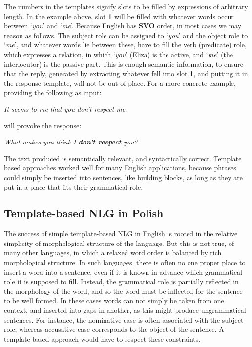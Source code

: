 \documentclass[12pt]{article}
\newcommand{\gloss}[1]{\vspace{10pt}\indent\textit{#1}\vspace{5pt}}
\newcommand{\inlinegloss}[1]{`\textit{#1}'}
\begin{document}
The numbers in the templates signify slots to be filled by expressions of arbitrary length. In the example above, slot \textbf{1} will be filled with whatever words occur between \inlinegloss{you} and \inlinegloss{me}. Because English has \textbf{SVO} order, in most cases we may reason as follows. The subject role can be assigned to \inlinegloss{you} and the object role to \inlinegloss{me}, and whatever words lie between these, have to fill the verb (predicate) role, which expresses a relation, in which \inlinegloss{you} (Eliza) is the active, and \inlinegloss{me} (the interlocutor) is the passive part. This is enough semantic information, to ensure that the reply, generated by extracting whatever fell into slot \textbf{1}, and putting it in the response template, will not be out of place. For a more concrete example, providing the following as input:

\gloss{It seems to me that you don't respect me.}

\noindent will provoke the response:

\gloss{What makes you think I \textbf{don't respect} you?}

The text produced is semantically relevant, and syntactically correct.  Template based approaches worked well for many English applications, because phrases could simply be inserted into sentences, like building blocks, as long as they are put in a place that fits their grammatical role. 

\subsection{Template-based NLG in Polish}
The success of simple template-based NLG in English is rooted in the relative simplicity of morphological structure of the language. But this is not true, of many other languages, in which a relaxed word order is balanced by rich morphological structure. In such languages, there is often no one proper place to insert a word into a sentence, even if it is known in advance which grammatical role it is supposed to fill. Instead, the grammatical role is partially reflected in the morphology of the word, and so the word must be inflected for the sentence to be well formed. In these cases words can not simply be taken from one context, and inserted into gaps in another, as this might produce ungrammatical sentences.  For instance, the nominative case is often associated with the subject role, whereas accusative case corresponds to the object of the sentence. A template based approach would have to respect these constraints.
\end{document}

